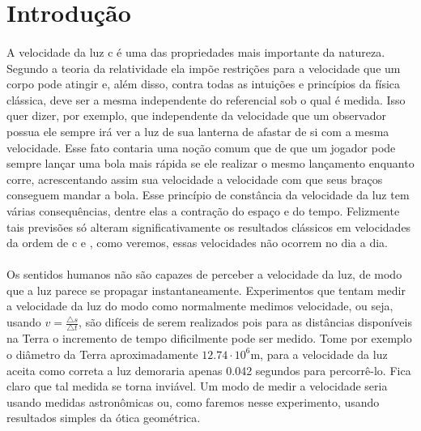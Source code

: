 \documentclass[a4paper,11pt]{article}
\begin{document}
\section{Introdução}

\paragraph{}A velocidade da luz c é uma das propriedades mais
importante da natureza. Segundo a teoria da relatividade
ela impõe restrições para a velocidade que um corpo pode
atingir e, além disso, contra todas as intuições e princípios
da física clássica, deve ser a mesma independente do
referencial sob o qual é medida. Isso quer dizer, por
exemplo, que independente da velocidade que um observador
possua ele sempre irá ver a luz de sua lanterna de afastar
de si com a mesma velocidade. Esse fato contaria uma noção
comum que de que um jogador pode sempre lançar uma bola mais
rápida se ele realizar o mesmo lançamento enquanto corre,
acrescentando assim sua velocidade a velocidade com que seus
braços conseguem mandar a bola. Esse princípio de constância
da velocidade da luz tem várias consequências, dentre elas a
contração do espaço e do tempo. Felizmente tais previsões só
alteram significativamente os resultados clássicos em
velocidades da ordem de c e , como veremos, essas
velocidades não ocorrem no dia a dia.

\paragraph{} Os sentidos humanos não são capazes de perceber
a velocidade da luz, de modo que a luz parece se propagar
instantaneamente. Experimentos que tentam medir a velocidade
da luz do modo como normalmente medimos velocidade, ou seja,
usando $v = \frac{\triangle s}{\triangle t}$, são difíceis de
serem realizados pois para as distâncias disponíveis na
Terra o incremento de tempo dificilmente pode ser medido.
Tome por exemplo o diâmetro da Terra aproximadamente $12.74
\cdot 10^6$m, para a velocidade da luz aceita como correta a
luz demoraria apenas 0.042 segundos para percorrê-lo. Fica
claro que tal medida se torna inviável. Um modo de medir a
velocidade seria usando medidas astronômicas ou, como
faremos nesse experimento, usando resultados simples da
ótica geométrica.
\end{document}
